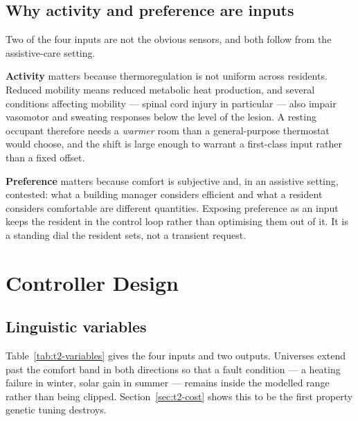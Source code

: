 \subsection{Why activity and preference are inputs}

Two of the four inputs are not the obvious sensors, and both follow from the
assistive-care setting.

\textbf{Activity} matters because thermoregulation is not uniform across
residents. Reduced mobility means reduced metabolic heat production, and
several conditions affecting mobility --- spinal cord injury in particular ---
also impair vasomotor and sweating responses below the level of the lesion. A
resting occupant therefore needs a \emph{warmer} room than a general-purpose
thermostat would choose, and the shift is large enough to warrant a first-class
input rather than a fixed offset.

\textbf{Preference} matters because comfort is subjective and, in an assistive
setting, contested: what a building manager considers efficient and what a
resident considers comfortable are different quantities. Exposing preference as
an input keeps the resident in the control loop rather than optimising them out
of it. It is a standing dial the resident sets, not a transient request.

\section{Controller Design}
\label{sec:t2-design}

\subsection{Linguistic variables}

Table~\ref{tab:t2-variables} gives the four inputs and two outputs. Universes
extend past the comfort band in both directions so that a fault condition --- a
heating failure in winter, solar gain in summer --- remains inside the modelled
range rather than being clipped. Section~\ref{sec:t2-cost} shows this to be the
first property genetic tuning destroys.

